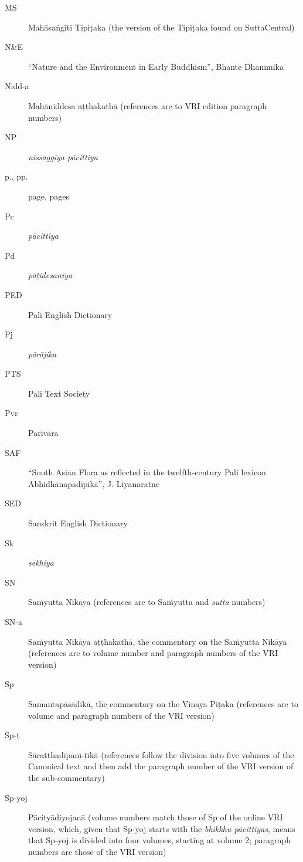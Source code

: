 \documentclass[12pt,openany]{book}%
\begin{document}
\begin{description}
\item[MS] \textsanskrit{Mahāsaṅgīti} \textsanskrit{Tipiṭaka} (the version of the \textsanskrit{Tipiṭaka} found on SuttaCentral)%
\item[N\&E] “Nature and the Environment in Early Buddhism”, Bhante Dhammika%
\item[Nidd-a] \textsanskrit{Mahāniddesa} \textsanskrit{aṭṭhakathā} (references are to VRI edition paragraph numbers)%
\item[NP] \textit{nissaggiya \textsanskrit{pācittiya}}%
\item[p., pp.] page, pages%
\item[Pc] \textit{\textsanskrit{pācittiya}}%
\item[Pd] \textit{\textsanskrit{pāṭidesanīya}}%
\item[PED] Pali English Dictionary%
\item[Pj] \textit{\textsanskrit{pārājika}}%
\item[PTS] Pali Text Society%
\item[Pvr] \textsanskrit{Parivāra}%
\item[SAF] “South Asian Flora as reflected in the twelfth-century Pali lexicon \textsanskrit{Abhidhānapadīpikā}”, J. Liyanaratne%
\item[SED] Sanskrit English Dictionary%
\item[Sk] \textit{sekhiya}%
\item[SN] \textsanskrit{Saṁyutta} \textsanskrit{Nikāya} (references are to \textsanskrit{Saṁyutta} and \textit{sutta} numbers)%
\item[SN-a] \textsanskrit{Saṁyutta} \textsanskrit{Nikāya} \textsanskrit{aṭṭhakathā}, the commentary on the \textsanskrit{Saṁyutta} \textsanskrit{Nikāya} (references are to volume number and paragraph numbers of the VRI version)%
\item[Sp] Samantapāsādikā, the commentary on the Vinaya \textsanskrit{Piṭaka} (references are to volume and paragraph numbers of the VRI version)%
\item[Sp‑ṭ] Sāratthadīpanī-ṭīkā (references follow the division into five volumes of the Canonical text and then add the paragraph number of the VRI version of the sub-commentary)%
\item[Sp‑yoj] \textsanskrit{Pācityādiyojanā} (volume numbers match those of Sp of the online VRI version, which, given that Sp‑yoj starts with the \textit{bhikkhu \textsanskrit{pācittiyas}}, means that Sp‑yoj is divided into four volumes, starting at volume 2; paragraph numbers are those of the VRI version)%

\end{description}
\end{document}

